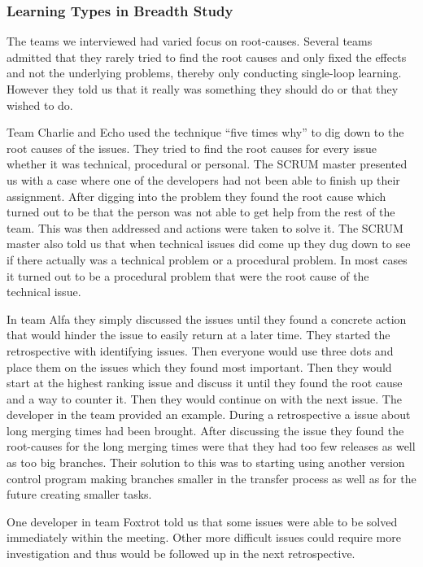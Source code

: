 \subsubsection{Learning Types in Breadth Study}
\label{question-13} 
The teams we interviewed had varied focus on root-causes. Several teams admitted that they rarely tried to find the root causes and only fixed the effects and not the underlying problems, thereby only conducting single-loop learning. However they told us that it really was something they should do or that they wished to do. 

Team Charlie and Echo used the technique ``five times why'' to dig down to the root causes of the issues. They tried to find the root causes for every issue whether it was technical, procedural or personal. The SCRUM master presented us with a case where one of the developers had not been able to finish up their assignment. After digging into the problem they found the root cause which turned out to be that the person was not able to get help from the rest of the team. This was then addressed and actions were taken to solve it. The SCRUM master also told us that when technical issues did come up they dug down to see if there actually was a technical problem or a procedural problem. In most cases it turned out to be a procedural problem that were the root cause of the technical issue.

In team Alfa they simply discussed the issues until they found a concrete action that would hinder the issue to easily return at a later time. They started the retrospective with identifying issues. Then everyone would use three dots and place them on the issues which they found most important. Then they would start at the highest ranking issue and discuss it until they found the root cause and a way to counter it. Then they would continue on with the next issue. The developer in the team provided an example. During a retrospective a issue about long merging times had been brought. After discussing the issue they found the root-causes for the long merging times were that they had too few releases as well as too big branches. Their solution to this was to starting using another version control program making branches smaller in the transfer process as well as for the future creating smaller tasks. 

One developer in team Foxtrot told us that some issues were able to be solved immediately within the meeting. Other more difficult issues could require more investigation and thus would be followed up in the next retrospective. 

